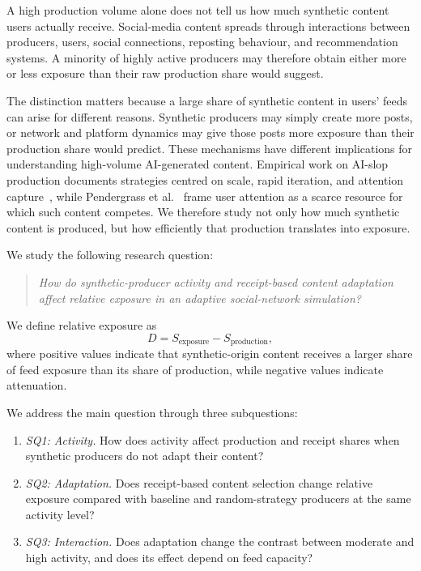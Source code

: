 \documentclass[runningheads]{llncs}
\begin{document}
A high production volume alone does not tell us how much synthetic content users actually receive. Social-media content spreads through interactions between producers, users, social connections, reposting behaviour, and recommendation systems. A minority of highly active producers may therefore obtain either more or less exposure than their raw production share would suggest.

The distinction matters because a large share of synthetic content in users' feeds can arise for different reasons. Synthetic producers may simply create more posts, or network and platform dynamics may give those posts more exposure than their production share would predict. These mechanisms have different implications for understanding high-volume AI-generated content. Empirical work on AI-slop production documents strategies centred on scale, rapid iteration, and attention capture~\cite{tang2026}, while Pendergrass et al.~\cite{pendergrass2025} frame user attention as a scarce resource for which such content competes. We therefore study not only how much synthetic content is produced, but how efficiently that production translates into exposure.

We study the following research question:

\begin{quote}
\textit{How do synthetic-producer activity and receipt-based content adaptation affect relative exposure in an adaptive social-network simulation?}
\end{quote}

We define relative exposure as
\[\boxed{
D = S_{\mathrm{exposure}} - S_{\mathrm{production}}},
\]
where positive values indicate that synthetic-origin content receives a larger
share of feed exposure than its share of production, while negative values
indicate attenuation.

We address the main question through three subquestions:
\begin{enumerate}
\item \textit{SQ1: Activity.} How does activity affect production and receipt shares when synthetic producers do not adapt their content?
\item \textit{SQ2: Adaptation.} Does receipt-based content selection change relative exposure compared with baseline and random-strategy producers at the same activity level?
\item \textit{SQ3: Interaction.} Does adaptation change the contrast between moderate and high activity, and does its effect depend on feed capacity?
\end{enumerate}
\end{document}
